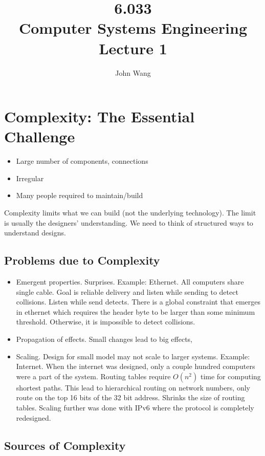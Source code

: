 \documentclass[psamsfonts]{amsart}
\title{6.033 \\
Computer Systems Engineering \\
Lecture 1}
\author{John Wang}
\begin{document}
\maketitle

\section{Complexity: The Essential Challenge}

\begin{itemize}
\item Large number of components, connections
\item Irregular
\item Many people required to maintain/build
\end{itemize}

Complexity limits what we can build (not the underlying technology). The limit is usually the designers' understanding. We need to think of structured ways to understand designs.

\subsection{Problems due to Complexity}

\begin{itemize}
\item Emergent properties. Surprises. Example: Ethernet. All computers share single cable. Goal is reliable delivery and listen while sending to detect collisions. Listen while send detects. There is a global constraint that emerges in ethernet which requires the header byte to be larger than some minimum threshold. Otherwise, it is impossible to detect collisions. 
\item Propagation of effects. Small changes lead to big effects,
\item Scaling. Design for small model may not scale to larger systems. Example: Internet. When the internet was designed, only a couple hundred computers were a part of the system. Routing tables require $O(n^2)$ time for computing shortest paths. This lead to hierarchical routing on network numbers, only route on the top 16 bits of the 32 bit address. Shrinks the size of routing tables. Scaling further was done with IPv6 where the protocol is completely redesigned. 
\end{itemize}

\subsection{Sources of Complexity}
\end{document}
